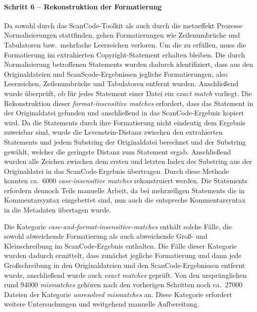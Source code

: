 \paragraph{Schritt 6 -- Rekonstruktion der Formatierung}
Da sowohl durch das ScanCode-Toolkit als auch durch die metaeffekt Prozesse Normalisierungen stattfinden, gehen Formatierungen wie Zeilenumbrüche und Tabulatoren bzw.\ mehrfache Leerzeichen verloren.
Um die  zu erfüllen, muss die Formatierung im extrahierten Copyright-Statement erhalten bleiben.
Die durch Normalisierung betroffenen Statements wurden dadurch identifiziert, dass aus den Originaldateien und ScanScode-Ergebnissen jegliche Formatierungen, also Leerzeichen, Zeilenumbrüche und Tabulatoren entfernt wurden.
Anschließend wurde überprüft, ob für jedes Statement einer Datei ein \textit{exact match} vorliegt.
Die Rekonstruktion dieser \textit{format-insensitive matches} erfordert, dass das Statement in der Originaldatei gefunden und anschließend in das ScanCode-Ergebnis kopiert wird.
Da die Statements durch ihre Formatierung nicht eindeutig dem Ergebnis zuweisbar sind, wurde die Levenstein-Distanz zwischen den extrahierten Statements und jedem Substring der Originaldatei berechnet und der Substring gewählt, welcher die geringste Distanz zum Statement ergab.
Anschließend wurden alle Zeichen zwischen dem ersten und letzten Index des Substring aus der Originaldatei in das ScanCode-Ergebnis übertragen.
Durch diese Methode konnten ca.\ \num{6000} \textit{case-insensitive matches} rekonstruiert werden.
Die Statements erfordern dennoch Teils manuelle Arbeit, da bei mehrzeiligen Statements die in Kommentarsyntax eingebettet sind, nun auch die entspreche Kommentarsyntax in die Metadaten übertagen wurde.

Die Kategorie \textit{case-and-format-insensitive-matches} enthält solche Fälle, die sowohl abweichende Formatierung als auch abweichende Groß- und Kleinschreibung im ScanCode-Ergebnis enthalten.
Die Fälle dieser Kategorie wurden dadurch ermittelt, dass zunächst jegliche Formatierung und dann jede Großschreibung in den Originaldateien und den ScanCode-Ergebnissen entfernt wurde, anschließend wurde auch \textit{exact matches} geprüft.
Von den ursprünglichen rund \num{94000} \textit{mismatches} gehören nach den vorherigen Schritten noch ca.\ \num{27000} Dateien der Kategorie \textit{unresolved mismatches} an.
Diese Kategorie erfordert weitere Untersuchungen und weitgehend manuelle Aufbereitung.

